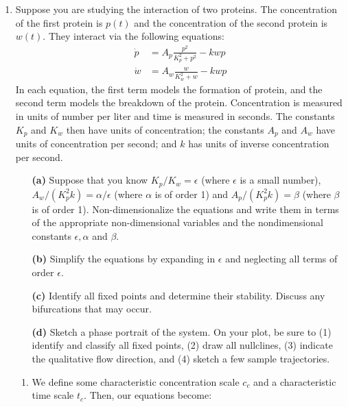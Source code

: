 \documentclass[10pt,letterpaper]{report}
\begin{document}
\begin{enumerate}
\item \begin{qbox}
Suppose you are studying the interaction of two proteins. The concentration of the
first protein is $p(t)$ and the concentration of the second protein is $w(t)$. They interact via the
following equations:
\begin{align*}
\dot p &= A_p \frac{p^2}{K_p^2 + p^2} - kwp \\
\dot w &= A_w \frac{w}{K_w^2 + w} - kwp
\end{align*}
In each equation, the first term models the formation of protein, and the second term models the breakdown of the protein. Concentration is measured in units of number per liter and time is measured in seconds. The constants $K_p$ and $K_w$ then have units of concentration; the constants $A_p$ and $A_w$ have units of concentration per second; and $k$ has units of inverse
concentration per second.
\begin{itemize}
    \item[\textbf{(a)}] Suppose that you know $K_p/K_w = \epsilon$ (where $\epsilon$ is a small number), $A_w /(K^2_pk) = \alpha / \epsilon$ (where $\alpha$ is of order 1) and $A_p/(K^2_pk) = \beta$ (where $\beta$ is of order 1). Non-dimensionalize the equations and write them in terms of the appropriate non-dimensional variables and the nondimensional constants $\epsilon,\alpha$ and $\beta$.
    
    \item[\textbf{(b)}] Simplify the equations by expanding in $\epsilon$ and neglecting all terms of order $\epsilon$.
    
    \item[\textbf{(c)}] Identify all fixed points and determine their stability. Discuss any bifurcations that may occur.
    
    \item[\textbf{(d)}] Sketch a phase portrait of the system. On your plot, be sure to (1) identify and classify all fixed points, (2) draw all nullclines, (3) indicate the qualitative flow direction, and (4) sketch a few sample trajectories.
\end{itemize}
\end{qbox}
\begin{enumerate}
    \item We define some characteristic concentration scale $c_c$ and a characteristic time scale $t_c$. Then, our equations become:
    

\end{enumerate}
\end{enumerate}
\end{document}
